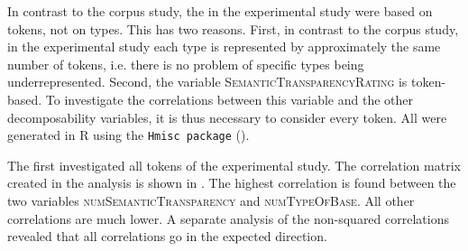  In contrast to the corpus study, the  in the experimental study were based on tokens, not on types. This has two reasons. First, in contrast to the corpus study, in the experimental study each type is represented by approximately the same number of tokens, i.e. there is no problem of specific types being underrepresented. Second, the variable \textsc{SemanticTransparencyRating} is token-based. To investigate the correlations between this variable and the other decomposability variables, it is thus necessary to consider every token.
All  were generated in R using the \texttt{Hmisc package} (\citealt{Harrell.2017}).

   The first  investigated all tokens of the experimental  study. The correlation matrix created in the analysis is shown in . 
   The highest correlation is found between the two variables \textsc{numSemanticTransparency} and \textsc{numTypeOfBase}. All other correlations are much lower. A separate analysis of the non-squared correlations revealed that all correlations go in the expected direction. 
   
   


\begin{table}


\caption{Correlation matrix for decomposability measures in experimental study}
\label{tab: Correlation matrix for all decomposability measures in experimental study}
	
\end{table}

